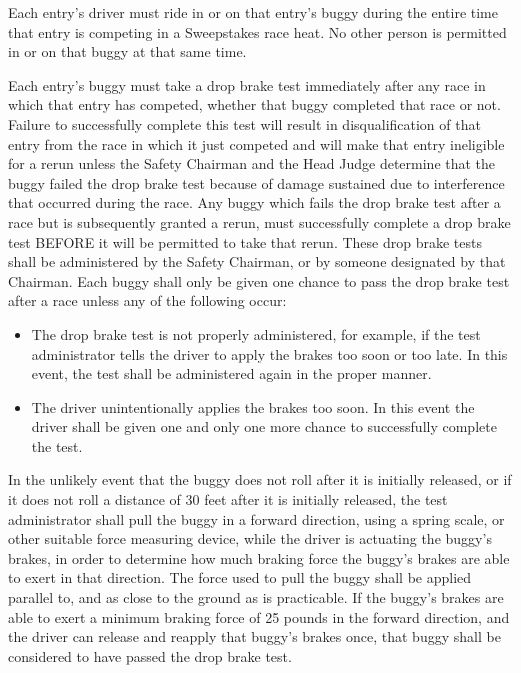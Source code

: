 	Each entry's driver must ride in or on that entry's buggy during the entire time that entry is competing in a Sweepstakes race heat. No other person is permitted in or on that buggy at that same time.

	Each entry's buggy must take a drop brake test immediately after any race in which that entry has competed, whether that buggy completed that race or not. Failure to successfully complete this test will result in disqualification of that entry from the race in which it just competed and will make that entry ineligible for a rerun unless the Safety Chairman and the Head Judge determine that the buggy failed the drop brake test because of damage sustained due to interference that occurred during the race. Any buggy which fails the drop brake test after a race but is subsequently granted a rerun, must successfully complete a drop brake test BEFORE it will be permitted to take that rerun. These drop brake tests shall be administered by the Safety Chairman, or by someone designated by that Chairman. Each buggy shall only be given one chance to pass the drop brake test after a race unless any of the following occur:

	\begin{itemize}

		\item
		The drop brake test is not properly administered, for example, if the test administrator tells the driver to apply the brakes too soon or too late. In this event, the test shall be administered again in the proper manner.

		\item
		The driver unintentionally applies the brakes too soon. In this event the driver shall be given one and only one more chance to successfully complete the test.

	\end{itemize}

	In the unlikely event that the buggy does not roll after it is initially released, or if it does not roll a distance of 30 feet after it is initially released, the test administrator shall pull the buggy in a forward direction, using a spring scale, or other suitable force measuring device, while the driver is actuating the buggy's brakes, in order to determine how much braking force the buggy's brakes are able to exert in that direction. The force used to pull the buggy shall be applied parallel to, and as close to the ground as is practicable. If the buggy's brakes are able to exert a minimum braking force of 25 pounds in the forward direction, and the driver can release and reapply that buggy's brakes once, that buggy shall be considered to have passed the drop brake test.

